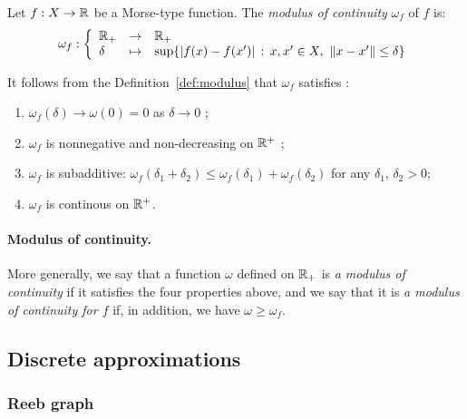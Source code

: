 \begin{defin}\label{def:modulus}
Let $f:X\rightarrow\mathbb{R}$ be a Morse-type function. %
The {\em modulus of continuity} $\omega_f$ %
of $f$ is: %
\begin{equation*}
\omega_f: \left\{ \begin{array}{lll} \mathbb{R}_+ & \rightarrow & \mathbb{R}_+ \\ \delta & \mapsto & \sup\{|f(x) -  f(x')|\,:\,x,x'\in X,\ \|x - x'\| \leq \delta \} \end{array} \right.
\end{equation*} 
\end{defin}

It follows from the Definition~\ref{def:modulus} that $\omega_f$  satisfies :
\begin{enumerate}
\item $ \omega_f(\delta)  \rightarrow \omega(0) = 0$  as $ \delta \rightarrow 0$ ;
\item $\omega_f$ is nonnegative and non-decreasing on $\mathbb{R}^+$ ;
\item $\omega_f$ is subadditive: $\omega_f(\delta_1 + \delta_2) \leq \omega_f(\delta_1) +\omega_f(\delta_2) $ for any $\delta_1$, $\delta_2 >0$;
\item $\omega_f$  is continous on $\mathbb{R}^+$.
\end{enumerate}


\paragraph*{Modulus of continuity.} More generally, we say that a function $\omega$ defined on $\mathbb{R}_+$ is 
\emph{a modulus of continuity} if it satisfies the four properties above, 
and we say that it is \emph{a modulus of continuity for $f$} if, in addition, we have
$\omega\geq\omega_f$.


\subsection{Discrete approximations}
\label{sec:Reebapprox}

\subsubsection*{Reeb graph}

